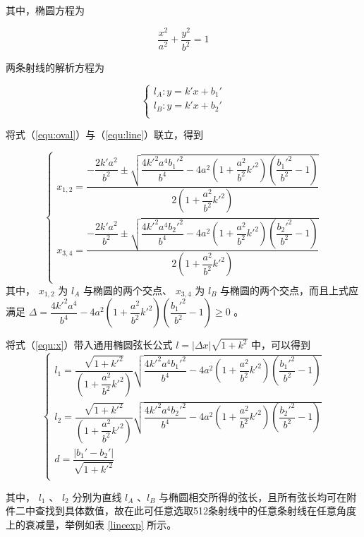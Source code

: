 \documentclass[UTF8]{ctexart}
\begin{document}
其中，椭圆方程为

\begin{equation}
\label{equ:oval}
 \frac{x^2}{a^2}+ \frac{y^2}{b^2}=1 
\end{equation}

两条射线的解析方程为

\begin{equation}
\label{equ:line}
  \begin{cases}
    l_A: y=k'x+b_1' \\
    l_B: y=k'x+b_2'  \\
  \end{cases}
\end{equation}

将式（\ref{equ:oval}）与（\ref{equ:line}）联立，得到

\begin{equation}
\label{equ:x}
  \begin{cases}
    x_{1,2}=\dfrac{-\dfrac{2k'a^2}{b^2}\pm\sqrt{\dfrac{4k'^2a^4b_1'^2}{b^4}-4a^2(1+\dfrac{a^2}{b^2}k'^2)(\dfrac{b_1'^2}{b^2}-1)}}{2(1+\dfrac{a^2}{b^2}k'^2)}  \\
    x_{3,4}=\dfrac{-\dfrac{2k'a^2}{b^2}\pm\sqrt{\dfrac{4k'^2a^4b_2'^2}{b^4}-4a^2(1+\dfrac{a^2}{b^2}k'^2)(\dfrac{b_2'^2}{b^2}-1)}}{2(1+\dfrac{a^2}{b^2}k'^2)}  \\
  \end{cases}
\end{equation}
其中， $x_{1,2}$ 为 $l_A$ 与椭圆的两个交点、 $x_{3,4}$ 为 $l_B$ 与椭圆的两个交点，而且上式应满足 $\Delta=\dfrac{4k'^2a^4}{b^4}-4a^2(1+\dfrac{a^2}{b^2}k'^2)(\dfrac{b_1'^2}{b^2}-1)\geq0$ 。

将式（\ref{equ:x}）带入通用椭圆弦长公式 $l=|\Delta x|\sqrt{1+k^2}$ 中，可以得到
\begin{equation}
\label{equ:xian}
  \begin{cases}
    l_1=\dfrac{\sqrt{1+k'^2}}{(1+\dfrac{a^2}{b^2}k'^2)}\sqrt{\dfrac{4k'^2a^4b_1'^2}{b^4}-4a^2(1+\dfrac{a^2}{b^2}k'^2)(\dfrac{b_1'^2}{b^2}-1)}  \\
    l_2=\dfrac{\sqrt{1+k'^2}}{(1+\dfrac{a^2}{b^2}k'^2)}\sqrt{\dfrac{4k'^2a^4b_2'^2}{b^4}-4a^2(1+\dfrac{a^2}{b^2}k'^2)(\dfrac{b_2'^2}{b^2}-1)}  \\
    d=\dfrac{|b_1'-b_2'|}{\sqrt{1+k'^2}}  \\
  \end{cases}
\end{equation}

其中， $l_1$ 、 $l_2$ 分别为直线 $l_A$ 、$l_B$ 与椭圆相交所得的弦长，且所有弦长均可在附件二中查找到具体数值，故在此可任意选取512条射线中的任意条射线在任意角度上的衰减量，举例如表 \ref{lineexp} 所示。
\end{document}
